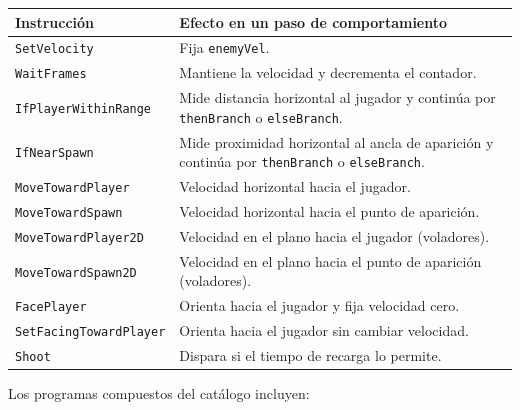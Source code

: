 \begin{samepage}
\begin{center}
  \label{tab:dsl-primitivas}
  \smallskip
  \begin{tabularx}{\textwidth}{@{}>{\raggedright\arraybackslash}p{4cm} >{\raggedright\arraybackslash}X@{}}
    \textbf{Instrucción} & \textbf{Efecto en un paso de comportamiento} \\
    \hline
    \texttt{SetVelocity} & Fija \texttt{enemyVel}. \\
    \texttt{WaitFrames} & Mantiene la velocidad y decrementa el contador. \\
    \texttt{IfPlayerWithin\-Range} &
    Mide distancia horizontal al jugador y continúa por \texttt{thenBranch} o
    \texttt{elseBranch}. \\
    \texttt{IfNearSpawn} &
    Mide proximidad horizontal al ancla de aparición y continúa por
    \texttt{thenBranch} o \texttt{elseBranch}. \\
    \texttt{MoveToward\-Player} & Velocidad horizontal hacia el jugador. \\
    \texttt{MoveToward\-Spawn} & Velocidad horizontal hacia el punto de aparición. \\
    \texttt{MoveToward\-Player2D} & Velocidad en el plano hacia el jugador (voladores). \\
    \texttt{MoveToward\-Spawn2D} & Velocidad en el plano hacia el punto de aparición (voladores). \\
    \texttt{FacePlayer} & Orienta hacia el jugador y fija velocidad cero. \\
    \texttt{SetFacing\-Toward\-Player} & Orienta hacia el jugador sin cambiar velocidad. \\
    \texttt{Shoot} & Dispara si el tiempo de recarga lo permite. \\
  \end{tabularx}
\end{center}
\end{samepage}

Los programas compuestos del catálogo incluyen:

